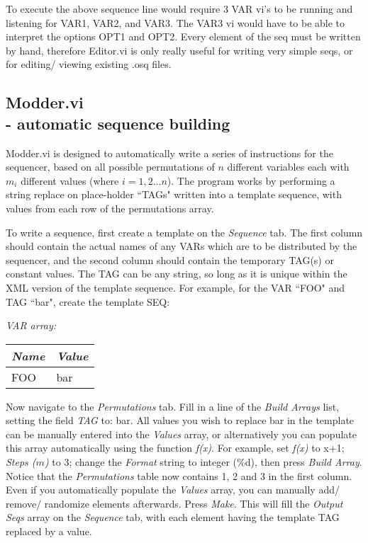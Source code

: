 \documentclass[10pt,a4paper]{article}
\begin{document}
To execute the above sequence line would require 3 VAR vi's to be running and listening for VAR1, VAR2, and VAR3.  The VAR3 vi would have to be able to interpret the options OPT1 and OPT2.  Every element of the seq must be written by hand, therefore Editor.vi is only really useful for writing very simple seqs, or for editing/ viewing existing .osq files.

\subsection[Modder.vi]{\label{sex:modder}Modder.vi \\ %
	\normalsize - automatic sequence building}

Modder.vi is designed to automatically write a series of instructions for the sequencer, based on all possible permutations of $n$ different variables each with $m_i$ different values (where $i = 1, 2 \dots n$).  The program works by performing a string replace on place-holder ``TAGs" written into a template sequence, with values from each row of the permutations array.  

To write a sequence, first create a template on the \emph{Sequence} tab.  The first column should contain the actual names of any VARs which are to be distributed by the sequencer, and the second column should contain the temporary TAG(s) or constant values.  The TAG can be any string, so long as it is unique within the XML version of the template sequence.  For example, for the VAR ``FOO" and TAG ``bar", create the template SEQ:

\hangindent=0.7cm
\emph{VAR array:} \\
\begin{tabularx}{0.3\textwidth}{X|X}
	\emph{Name} & \emph{Value} \\
	\hline
	FOO & bar \\
\end{tabularx}
\vspace{3mm}

Now navigate to the \emph{Permutations} tab.  Fill in a line of the \emph{Build Arrays} list, setting the field \emph{TAG} to: bar.  All values you wish to replace bar in the template can be manually entered into the \emph{Values} array, or alternatively you can populate this array automatically using the function \emph{f(x)}.  For example, set \emph{f(x)} to x+1; \emph{Steps ($m$)} to 3; change the \emph{Format} string to integer (\%d), then press \emph{Build Array}.  Notice that the \emph{Permutations} table now contains 1, 2 and 3 in the first column.  Even if you automatically populate the \emph{Values} array, you can manually add/ remove/ randomize elements afterwards. Press \emph{Make}.  This will fill the \emph{Output Seqs} array on the \emph{Sequence} tab, with each element having the template TAG replaced by a value.
\end{document}
